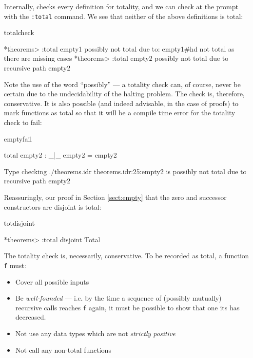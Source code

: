 \noindent
Internally, \Idris{} checks every definition for totality, and we can check at
the prompt with the \texttt{:total} command. We see that neither of the above
definitions is total:

\begin{SaveVerbatim}{totalcheck}

*theorems> :total empty1
possibly not total due to: empty1#hd
	not total as there are missing cases
*theorems> :total empty2
possibly not total due to recursive path empty2

\end{SaveVerbatim}

\noindent
Note the use of the word ``possibly'' --- a totality check can, of course,
never be certain due to the undecidability of the halting problem. The check
is, therefore, conservative.  It is also possible (and indeed advisable, in the
case of proofs) to mark functions as total so that it will be a compile time
error for the totality check to fail:

\begin{SaveVerbatim}{emptyfail}

total empty2 : _|_
empty2 = empty2

Type checking ./theorems.idr
theorems.idr:25:empty2 is possibly not total due to recursive path empty2 

\end{SaveVerbatim}

\noindent
Reassuringly, our proof in Section \ref{sect:empty} that the zero and successor constructors
are disjoint is total:

\begin{SaveVerbatim}{totdisjoint}

*theorems> :total disjoint
Total

\end{SaveVerbatim}

\noindent
The totality check is, necessarily, conservative. To be recorded as total, a
function \texttt{f} must:

\begin{itemize}
\item Cover all possible inputs
\item Be \emph{well-founded} --- i.e. by the time a sequence of 
(possibly mutually) recursive calls reaches \texttt{f} again, it must
be possible to show that one its has decreased.
\item Not use any data types which are not \emph{strictly positive}
\item Not call any non-total functions
\end{itemize}

